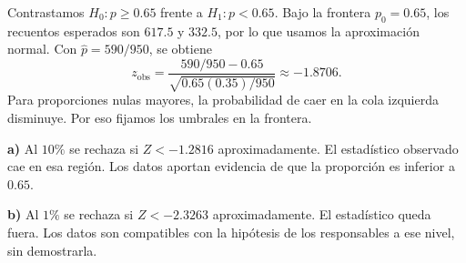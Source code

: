 Contrastamos $H_0:p\ge0.65$ frente a $H_1:p<0.65$.
Bajo la frontera $p_0=0.65$, los recuentos esperados
son $617.5$ y $332.5$, por lo que usamos la aproximación normal.
Con $\hat p=590/950$, se obtiene
\[
z_{\mathrm{obs}}=\frac{590/950-0.65}{\sqrt{0.65(0.35)/950}}
\approx-1.8706.
\]
Para proporciones nulas mayores, la probabilidad de caer en la
cola izquierda disminuye. Por eso fijamos los umbrales en la frontera.

\textbf{a)} Al $10\%$ se rechaza si $Z<-1.2816$ aproximadamente.
El estadístico observado cae en esa región. Los datos aportan
evidencia de que la proporción es inferior a $0.65$.

\textbf{b)} Al $1\%$ se rechaza si $Z<-2.3263$ aproximadamente.
El estadístico queda fuera. Los datos son compatibles con
la hipótesis de los responsables a ese nivel, sin demostrarla.
